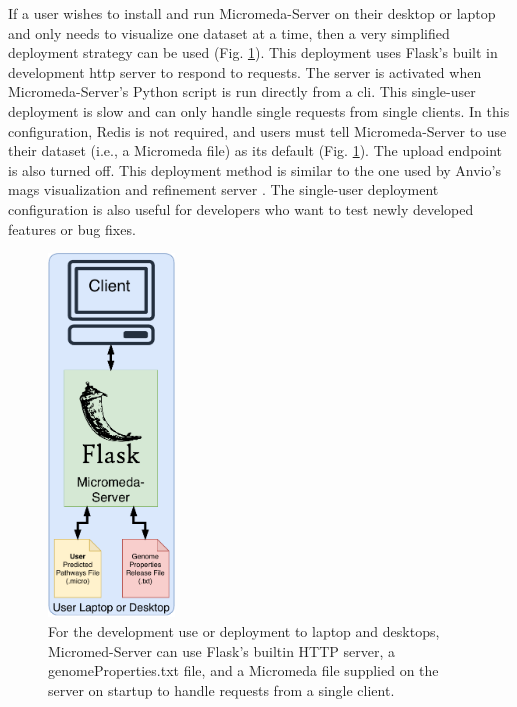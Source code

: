 If a user wishes to install and run Micromeda-Server on their desktop or laptop and only needs to visualize one dataset at a time, then a very simplified deployment strategy can be used (Fig. \ref{fig:micromeda-small-deploy}). This deployment uses Flask's built in development \gls{http} server to respond to requests. The server is activated when Micromeda-Server's Python script is run directly from a \gls{cli}. This single-user deployment is slow and can only handle single requests from single clients. In this configuration, Redis is not required, and users must tell Micromeda-Server to use their dataset (i.e., a Micromeda file) as its default (Fig. \ref{fig:micromeda-small-deploy}). The upload endpoint is also turned off. This deployment method is similar to the one used by Anvio's \gls{mags} visualization and refinement server \cite{eren2015anvi}. The single-user deployment configuration is also useful for developers who want to test newly developed features or bug fixes.

\begin{figure}[!ht]
  \centering
	\includegraphics[width=0.30\textwidth]{media/micromeda-simple-deployment.pdf}
	 \caption{For the development use or deployment to laptop and desktops, Micromed-Server can use Flask's builtin HTTP server, a genomeProperties.txt file, and a Micromeda file supplied on the server on startup to handle requests from a single client.}
	 \label{fig:micromeda-small-deploy}
\end{figure}

